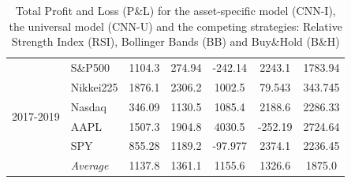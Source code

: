 \documentclass[12pt, a4paper]{article}
\begin{document}
\begin{table}[H]
\begin{tabular}{l|l|ccccc}
\hline
\multirow{6}{1cm}{2017-2019}   & S\&P500   & 1104.3  & 274.94  & -242.14 & 2243.1  & 1783.94 \\
          & Nikkei225 & 1876.1  & 2306.2  & 1002.5  & 79.543  & 343.745 \\
          & Nasdaq    & 346.09  & 1130.5  & 1085.4  & 2188.6  & 2286.33  \\
          & AAPL      & 1507.3  & 1904.8  & 4030.5  & -252.19 & 2724.64  \\
          & SPY       & 855.28  & 1189.2  & -97.977 & 2374.1  & 2236.45 \\
          \cline{2-7}
          & \textit{Average}   & 1137.8  & 1361.1  & 1155.6  & 1326.6  & 1875.0 
\end{tabular}
\caption{Total Profit and Loss (P\&L) for the asset-specific model (CNN-I), the universal model (CNN-U) and the competing strategies: Relative Strength Index (RSI), Bollinger Bands (BB) and Buy\&Hold (B\&H)}
\label{tbl:PandL}
\end{table}
\end{document}
